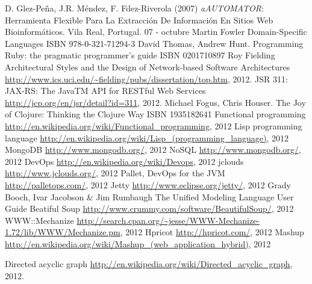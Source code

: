 \documentclass[a4paper,12pt,twoside]{report}
\begin{document}
\begin{thebibliography}{1}

  D. Glez-Peña, J.R. Méndez, F. Fdez-Riverola (2007)
  \newblock \emph{aAUTOMATOR}: Herramienta Flexible Para La
  Extracción De Información En Sitios Web Bioinformáticos. Vila Real,
  Portugal. 07 - octubre
  Martin Fowler
  \newblock Domain-Specific Languages
  \newblock ISBN 978-0-321-71294-3
  David Thomas, Andrew Hunt.
  \newblock Programming Ruby: the pragmatic programmer's guide
  \newblock ISBN 0201710897
  Roy Fielding
  \newblock Architectural Styles and
  the Design of Network-based Software Architectures
  \newblock
  \url{http://www.ics.uci.edu/~fielding/pubs/dissertation/top.htm},
  2012.
  \newblock JSR 311: JAX-RS: The JavaTM API for RESTful Web Services
  \newblock \url{http://jcp.org/en/jsr/detail?id=311}, 2012.
  Michael Fogus, Chris Houser.
  \newblock The Joy of Clojure: Thinking the Clojure Way
  \newblock ISBN 1935182641
  \newblock Functional programming
  \newblock \url{http://en.wikipedia.org/wiki/Functional_programming}, 2012
  \newblock Lisp programming language
  \newblock \url{http://en.wikipedia.org/wiki/Lisp_(programming_language)}, 2012
  \newblock MongoDB
  \newblock \url{http://www.mongodb.org/}, 2012
  \newblock NoSQL
  \newblock \url{http://www.mongodb.org/}, 2012
  \newblock DevOps
  \url{http://en.wikipedia.org/wiki/Devops}, 2012
  \newblock jclouds
  \newblock \url{http://www.jclouds.org/}, 2012
  \newblock Pallet, DevOps for the JVM
  \newblock \url{http://palletops.com/}, 2012
  \newblock Jetty
  \newblock \url{http://www.eclipse.org/jetty/}, 2012
  Grady Booch, Ivar Jacobson \& Jim Rumbaugh
  \newblock The Unified Modeling Language User Guide
  \newblock Beatiful Soup
  \newblock \url{http://www.crummy.com/software/BeautifulSoup/}, 2012
  \newblock WWW::Mechanize
  \newblock
  \url{http://search.cpan.org/~jesse/WWW-Mechanize-1.72/lib/WWW/Mechanize.pm},
  2012
  \newblock Hpricot
  \newblock \url{http://hpricot.com/}, 2012
  \newblock Mashup
  \newblock \url{http://en.wikipedia.org/wiki/Mashup_(web_application_hybrid)}, 2012

\newblock Directed acyclic graph
\newblock \url{http://en.wikipedia.org/wiki/Directed_acyclic_graph}, 2012.

\end{thebibliography}
\end{document}

